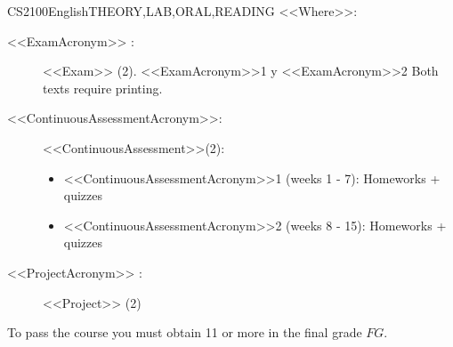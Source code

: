 \begin{evaluation}{CS2100}{English}{THEORY,LAB,ORAL,READING}
    \vspace{2mm}
    \noindent <<Where>>:
    \begin{description}
        \item[<<ExamAcronym>> :] <<Exam>> (2). <<ExamAcronym>>1 y <<ExamAcronym>>2 Both texts require printing.
        \item[<<ContinuousAssessmentAcronym>>:]<<ContinuousAssessment>>(2):
        \begin{itemize}
                \item <<ContinuousAssessmentAcronym>>1 (weeks 1 - 7): Homeworks + quizzes
                \item <<ContinuousAssessmentAcronym>>2 (weeks 8 - 15): Homeworks + quizzes
        \end{itemize}
        \item[<<ProjectAcronym>> :] <<Project>> (2)
    \end{description}
  \noindent To pass the course you must obtain 11 or more in the final grade $FG$.
  \end{evaluation}
 

